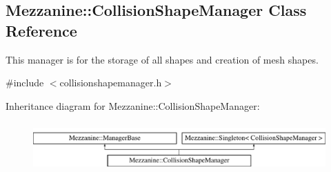 \hypertarget{classMezzanine_1_1CollisionShapeManager}{
\subsection{Mezzanine::CollisionShapeManager Class Reference}
\label{classMezzanine_1_1CollisionShapeManager}
}


This manager is for the storage of all shapes and creation of mesh shapes.  




{\ttfamily \#include $<$collisionshapemanager.h$>$}

Inheritance diagram for Mezzanine::CollisionShapeManager:\begin{figure}[H]
\begin{center}
\leavevmode
\includegraphics[height=1.879195cm]{classMezzanine_1_1CollisionShapeManager}
\end{center}
\end{figure}
